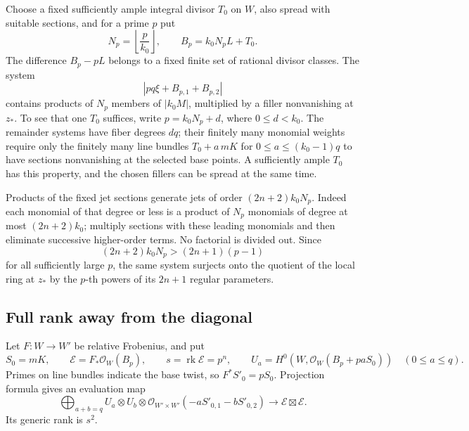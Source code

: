 \documentclass[11pt,letterpaper]{article}
\newcommand{\OO}{\mathcal{O}}
\DeclareMathOperator{\rk}{rk}
\theoremstyle{definition}
\theoremstyle{remark}
\begin{document}
Choose a fixed sufficiently ample integral divisor \(T_0\) on \(W\),
also spread with suitable sections, and for a prime \(p\) put
\begin{equation}
\label{proj:fr:bp}
 N_p=\left\lfloor\frac p{k_0}\right\rfloor,\qquad
 B_p=k_0N_pL+T_0.
\end{equation}
The difference \(B_p-pL\) belongs to a fixed finite set of rational
divisor classes. The system
\[
 |pq\xi+B_{p,1}+B_{p,2}|
\]
contains products of \(N_p\) members of \(|k_0M|\), multiplied by a
filler nonvanishing at \(z_*\). To see that one \(T_0\) suffices, write
\(p=k_0N_p+d\), where \(0\leq d<k_0\). The remainder systems have fiber
degrees \(dq\); their finitely many monomial weights require only the
finitely many line bundles \(T_0+a\,mK\) for
\(0\leq a\leq(k_0-1)q\) to have sections nonvanishing at the selected
base points. A sufficiently ample \(T_0\) has this property, and the
chosen fillers can be spread at the same time.

Products of the fixed jet sections generate jets of order
\((2n+2)k_0N_p\). Indeed each monomial of that degree or less is a
product of \(N_p\) monomials of degree at most \((2n+2)k_0\);
multiply sections with these leading monomials and then eliminate
successive higher-order terms. No factorial is divided out. Since
\[
 (2n+2)k_0N_p>(2n+1)(p-1)
\]
for all sufficiently large \(p\), the same system surjects onto the
quotient of the local ring at \(z_*\) by the \(p\)-th powers of its
\(2n+1\) regular parameters.

\subsection{Full rank away from the diagonal}

Let \(F:W\to W'\) be relative Frobenius, and put
\[
 S_0=mK,\qquad
 \mathcal E=F_*\OO_W(B_p),\qquad
 s=\rk\mathcal E=p^n,\qquad
 U_a=H^0(W,\OO_W(B_p+paS_0))
 \quad(0\leq a\leq q).
\]
Primes on line bundles indicate the base twist, so
\(F^*S'_0=pS_0\). Projection formula gives an evaluation map
\begin{equation}
\label{proj:fr:evaluation}
 \bigoplus_{a+b=q}
 U_a\otimes U_b\otimes
 \OO_{W'\times W'}(-aS'_{0,1}-bS'_{0,2})
 \longrightarrow\mathcal E\boxtimes\mathcal E.
\end{equation}
Its generic rank is \(s^2\).
\end{document}
